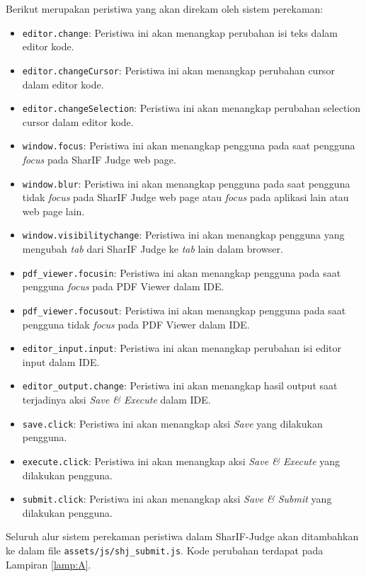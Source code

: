 Berikut merupakan peristiwa yang akan direkam oleh sistem perekaman:
\begin{itemize}
    \item \verb|editor.change|: Peristiwa ini akan menangkap perubahan isi teks dalam editor kode.
    \item \verb|editor.changeCursor|: Peristiwa ini akan menangkap perubahan cursor dalam editor kode. 
    \item \verb|editor.changeSelection|: Peristiwa ini akan menangkap perubahan selection cursor dalam editor kode.
    \item \verb|window.focus|: Peristiwa ini akan menangkap pengguna pada saat pengguna \textit{focus} pada SharIF Judge web page. 
    \item \verb|window.blur|: Peristiwa ini akan menangkap pengguna pada saat pengguna tidak \textit{focus} pada SharIF Judge web page atau \textit{focus} pada aplikasi lain atau web page lain.
    \item \verb|window.visibilitychange|: Peristiwa ini akan menangkap pengguna yang mengubah \textit{tab} dari SharIF Judge ke \textit{tab} lain dalam browser.
    \item \verb|pdf_viewer.focusin|: Peristiwa ini akan menangkap pengguna pada saat pengguna \textit{focus} pada PDF Viewer dalam IDE.
    \item \verb|pdf_viewer.focusout|: Peristiwa ini akan menangkap pengguna pada saat pengguna tidak \textit{focus} pada PDF Viewer dalam IDE.
    \item \verb|editor_input.input|: Peristiwa ini akan menangkap perubahan isi editor input dalam IDE. 
    \item \verb|editor_output.change|: Peristiwa ini akan menangkap hasil output saat terjadinya aksi \textit{Save \& Execute} dalam IDE.
    \item \verb|save.click|: Peristiwa ini akan menangkap aksi \textit{Save} yang dilakukan pengguna.
    \item \verb|execute.click|: Peristiwa ini akan menangkap aksi \textit{Save \& Execute} yang dilakukan pengguna.
    \item \verb|submit.click|: Peristiwa ini akan menangkap aksi \textit{Save \& Submit} yang dilakukan pengguna.
\end{itemize}

Seluruh alur sistem perekaman peristiwa dalam SharIF-Judge akan ditambahkan ke dalam file \verb|assets/js/|\verb|shj_submit.js|. Kode perubahan terdapat pada Lampiran \ref{lamp:A}.

